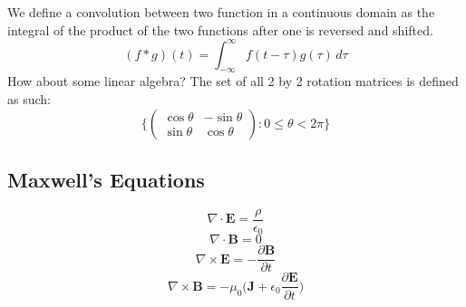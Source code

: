 \documentclass{article}
\begin{document}
  \newpage
  We define a convolution between two function in a continuous domain as the
  integral of the product of the two functions after one is reversed and
  shifted.
  \[
    (f*g)(t) = \int_{-\infty}^\infty f(t-\tau)g(\tau)\, d\tau
  \]
  How about some linear algebra? The set of all 2 by 2 rotation matrices is 
  defined as such:
  \[
    \bigg\{ 
    \begin{pmatrix}
        \cos\theta & -\sin\theta \\
        \sin\theta & \cos\theta
    \end{pmatrix}: 0 \leq \theta < 2\pi
    \bigg\}
  \]

  \subsection{Maxwell's Equations}

  \[
      \nabla\cdot\mathbf{E} = \frac{\rho}{\epsilon_0}
  \]
  \[
      \nabla\cdot\mathbf{B} = 0
  \]
  \[
      \nabla\times\mathbf{E} = -\frac{\partial\mathbf{B}}{\partial t}
  \]
  \[
      \nabla\times\mathbf{B} 
      = -\mu_0\bigg(\mathbf{J}
      +\epsilon_0\frac{\partial\mathbf{E}}{\partial t}\bigg)
  \]
\end{document}

